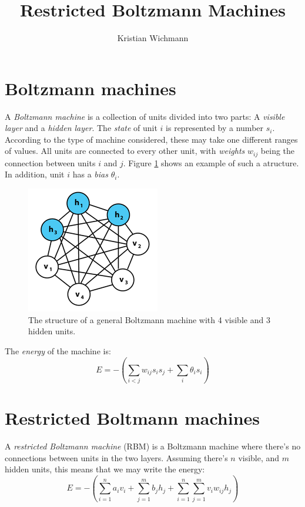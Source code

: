 \documentclass[12pt, a4paper]{article}
\title{Restricted Boltzmann Machines}
\author{Kristian Wichmann}
\numberwithin{equation}{section}
\begin{document}
\maketitle

\section{Boltzmann machines}
A \textit{Boltzmann machine} is a collection of units divided into two parts: A \textit{visible layer} and a \textit{hidden layer}. The \textit{state} of unit $i$ is represented by a number $s_i$. According to the type of machine considered, these may take one different ranges of values. All units are connected to every other unit, with \textit{weights} $w_{ij}$ being the connection between units $i$ and $j$. Figure \ref{fig:bm} shows an example of such a atructure. In addition, unit $i$ has a \textit{bias} $\theta_i$.

\begin{figure}
\centering
\includegraphics{bm}
\caption{The structure of a general Boltzmann machine with 4 visible and 3 hidden units.}
\label{fig:bm}
\end{figure}

The \textit{energy} of the machine is:
\begin{equation}
E=-\left(\sum_{i<j}w_{ij}s_i s_j+\sum_i\theta_i s_i\right)
\end{equation}


\section{Restricted Boltmann machines}
A \textit{restricted Boltzmann machine} (RBM) is a Boltzmann machine where there's no connections between units in the two layers. Assuming there's $n$ visible, and $m$ hidden units, this means that we may write the energy:
\begin{equation}
E=-\left(\sum_{i=1}^n a_i v_i+\sum_{j=1}^m b_j h_j+\sum_{i=1}^n\sum_{j=1}^m v_i w_{ij}h_j\right)
\end{equation}
\end{document}
